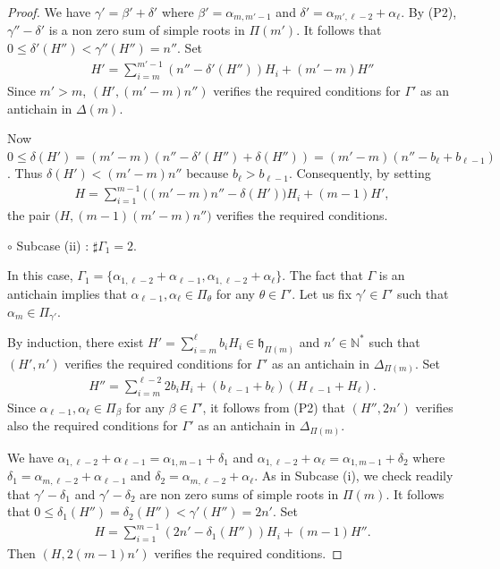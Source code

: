 \documentclass[10pt,a4paper]{amsart}
\numberwithin{equation}{section}
\theoremstyle{plain}
\theoremstyle{definition}
\theoremstyle{remark}
\begin{document}
\begin{proof}
We have $\gamma' = \beta' + \delta'$ where $\beta' = \alpha_{m,m'-1}$ and 
$\delta' = \alpha_{m',\ell-2}+\alpha_{\ell}$. By (P2), $\gamma'' - \delta'$ is a non zero sum 
of simple roots in $\Pi (m')$. It follows that 
$0 \leqslant \delta' ( H'') < \gamma'' (H'') = n''$. Set
$$\begin{array}{c}
H' = \sum\limits_{i=m}^{m'-1} ( n'' - \delta' (H'') ) H_{i}
+ (m'-m) H''
\end{array}$$
Since $m' > m$, $(H', (m'-m) n'')$ verifies the required conditions for $\Gamma'$ as an antichain in 
$\Delta(m)$.

Now
$
0 \leqslant \delta (H') = (m'-m) (n'' -\delta'(H'') + \delta (H'')  )
= (m'-m) (n'' - b_{\ell} + b_{\ell-1})$.
Thus $\delta (H') < (m'-m) n''$
because $b_{\ell} > b_{\ell-1}$. 
Consequently, by setting 
$$\begin{array}{c}
H = \sum\limits_{i=1}^{m-1} \bigl( (m'-m) n'' -  \delta ( H' )  \bigr) H_{i} + (m-1) H', 
\end{array}$$
the pair $\bigl( H , (m-1)(m'-m)n'' \bigr)$ verifies the required conditions.

\smallskip
\noindent $\circ$ Subcase (ii) : $\sharp \Gamma_{1} = 2$.
\smallskip

In this case, 
$\Gamma_{1} = \{ \alpha_{1,\ell-2} + \alpha_{\ell-1} , \alpha_{1,\ell-2} + \alpha_{\ell} \}$.
The fact that $\Gamma$ is an antichain implies that
$\alpha_{\ell-1}, \alpha_{\ell}\in \Pi_{\theta}$ for any $\theta \in \Gamma'$. 
Let us fix $\gamma' \in \Gamma'$ such that $\alpha_{m}\in\Pi_{\gamma'}$.

By induction, there exist $H' = \sum_{i=m}^{\ell} b_{i}H_{i} \in \mathfrak{h}_{\Pi(m)}$
and $n' \in \mathbb{N}^{*}$ such that $(H',n')$
verifies the required conditions for $\Gamma'$ as an antichain in $\Delta_{\Pi (m)}$.
Set 
$$\begin{array}{c}
H'' = \sum\limits_{i=m}^{\ell-2} 2 b_{i}H_{i}  + (b_{\ell-1} + b_{\ell} ) ( H_{\ell-1} + H_{\ell} ).
\end{array}$$
Since $\alpha_{\ell-1}, \alpha_{\ell} \in \Pi_{\beta}$  for any 
$\beta \in \Gamma'$, it follows from (P2) that $(H'' , 2n')$ verifies also the required conditions
for $\Gamma'$ as an antichain in $\Delta_{\Pi (m)}$.

We have $\alpha_{1,\ell-2} + \alpha_{\ell-1} = \alpha_{1,m-1} + \delta_{1}$ and
$\alpha_{1,\ell-2} + \alpha_{\ell}  = \alpha_{1,m-1} + \delta_{2}$ where 
$\delta_{1} = \alpha_{m,\ell-2} +\alpha_{\ell-1}$ and $\delta_{2} = \alpha_{m,\ell-2} +\alpha_{\ell}$.
As in Subcase (i), we check readily that $\gamma' - \delta_{1}$ and $\gamma'-\delta_{2}$ 
are non zero sums of simple roots in $\Pi (m)$. It follows that
$0 \leqslant \delta_{1} (H'') = \delta_{2} (H'' )  < \gamma'(H'') = 2n'$.
Set 
$$\begin{array}{c}
H = \sum\limits_{i=1}^{m-1} (2n' - \delta_{1}(H'') ) H_{i} + 
(m-1) H''.
\end{array}$$
Then $( H ,  2(m-1)n' )$ verifies the required conditions.
\smallskip


\end{proof}
\end{document}
